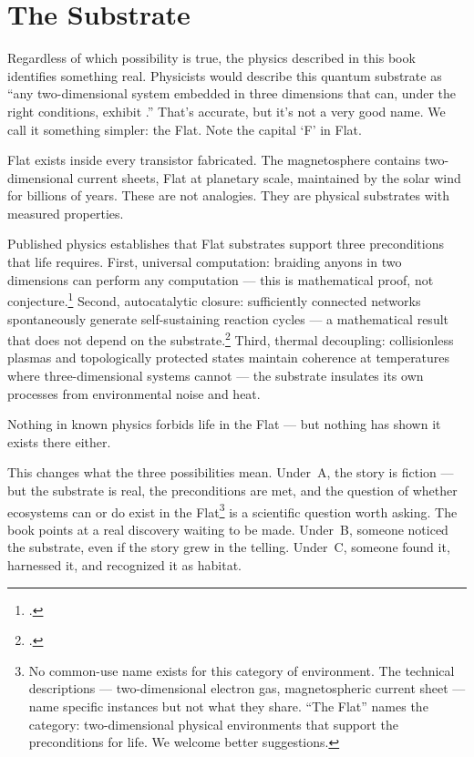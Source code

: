 \section*{The Substrate}
\label{spine:the-substrate}

Regardless of which possibility is true, the physics described in this book identifies something real. Physicists would describe this quantum substrate as ``any two-dimensional system embedded in three dimensions that can, under the right conditions, exhibit .'' That's accurate, but it's not a very good name. We call it something simpler: the Flat.  Note the capital `F' in Flat.

Flat exists inside every transistor fabricated. The magnetosphere contains two-dimensional current sheets, Flat at planetary scale, maintained by the solar wind for billions of years. These are not analogies. They are physical substrates with measured properties.

Published physics establishes that Flat substrates support three preconditions that life requires. First, universal computation: braiding anyons in two dimensions can perform any computation --- this is mathematical proof, not conjecture.\footcites{kitaev2003}{nayak2008} Second, autocatalytic closure: sufficiently connected networks spontaneously generate self-sustaining reaction cycles --- a mathematical result that does not depend on the substrate.\footcite{kauffman1993} Third, thermal decoupling: collisionless plasmas and topologically protected states maintain coherence at temperatures where three-dimensional systems cannot --- the substrate insulates its own processes from environmental noise and heat.

Nothing in known physics forbids life in the Flat --- but nothing has shown it exists there either.

This changes what the three possibilities mean. Under~A, the story is fiction --- but the substrate is real, the preconditions are met, and the question of whether ecosystems can or do exist in the Flat\footnote{No common-use name exists for this category of environment. The technical descriptions --- two-dimensional electron gas, magnetospheric current sheet --- name specific instances but not what they share. ``The Flat'' names the category: two-dimensional physical environments that support the preconditions for life. We welcome better suggestions.} is a scientific question worth asking. The book points at a real discovery waiting to be made. Under~B, someone noticed the substrate, even if the story grew in the telling. Under~C, someone found it, harnessed it, and recognized it as habitat.

